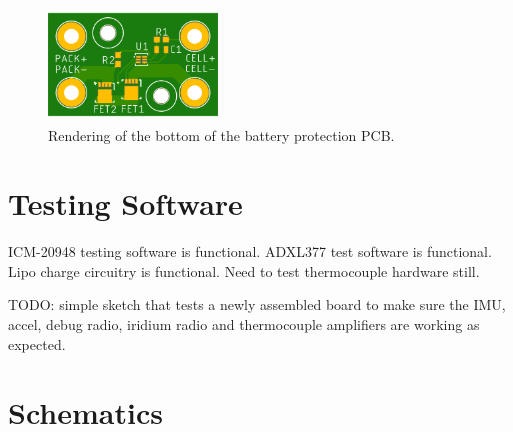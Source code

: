 \documentclass{article}
\begin{document}
\begin{figure}[H]
    \centering
    \includegraphics[width=0.4\textwidth]{images/BatteryProtection-render-top.png}
    \caption{Rendering of the bottom of the battery protection PCB.}
    \label{fig:bat-bottom}
\end{figure}

\section{Testing Software}

ICM-20948 testing software is functional. ADXL377 test software is functional. Lipo charge circuitry is functional. Need to test thermocouple hardware still.

TODO: simple sketch that tests a newly assembled board to make sure the IMU, accel, debug radio, iridium radio and thermocouple amplifiers are working as expected. 

























\appendix


\section{Schematics}
\label{appa}
\end{document}
